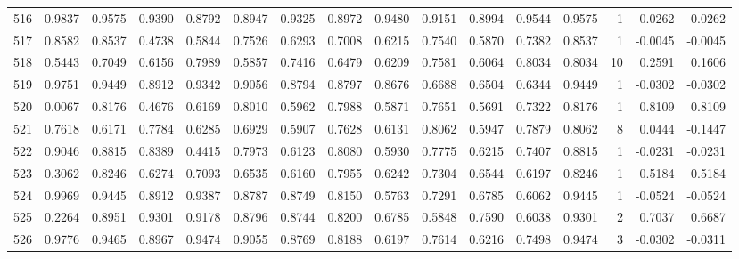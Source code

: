 \begin{tabular}{lrrrrrrrrrrrrrrr}
516 &      0.9837 &  0.9575 &  0.9390 &  0.8792 &  0.8947 &  0.9325 &  0.8972 &  0.9480 &  0.9151 &  0.8994 &   0.9544 &     0.9575 &      1 &                   -0.0262 &                    -0.0262 \\
517 &      0.8582 &  0.8537 &  0.4738 &  0.5844 &  0.7526 &  0.6293 &  0.7008 &  0.6215 &  0.7540 &  0.5870 &   0.7382 &     0.8537 &      1 &                   -0.0045 &                    -0.0045 \\
518 &      0.5443 &  0.7049 &  0.6156 &  0.7989 &  0.5857 &  0.7416 &  0.6479 &  0.6209 &  0.7581 &  0.6064 &   0.8034 &     0.8034 &     10 &                    0.2591 &                     0.1606 \\
519 &      0.9751 &  0.9449 &  0.8912 &  0.9342 &  0.9056 &  0.8794 &  0.8797 &  0.8676 &  0.6688 &  0.6504 &   0.6344 &     0.9449 &      1 &                   -0.0302 &                    -0.0302 \\
520 &      0.0067 &  0.8176 &  0.4676 &  0.6169 &  0.8010 &  0.5962 &  0.7988 &  0.5871 &  0.7651 &  0.5691 &   0.7322 &     0.8176 &      1 &                    0.8109 &                     0.8109 \\
521 &      0.7618 &  0.6171 &  0.7784 &  0.6285 &  0.6929 &  0.5907 &  0.7628 &  0.6131 &  0.8062 &  0.5947 &   0.7879 &     0.8062 &      8 &                    0.0444 &                    -0.1447 \\
522 &      0.9046 &  0.8815 &  0.8389 &  0.4415 &  0.7973 &  0.6123 &  0.8080 &  0.5930 &  0.7775 &  0.6215 &   0.7407 &     0.8815 &      1 &                   -0.0231 &                    -0.0231 \\
523 &      0.3062 &  0.8246 &  0.6274 &  0.7093 &  0.6535 &  0.6160 &  0.7955 &  0.6242 &  0.7304 &  0.6544 &   0.6197 &     0.8246 &      1 &                    0.5184 &                     0.5184 \\
524 &      0.9969 &  0.9445 &  0.8912 &  0.9387 &  0.8787 &  0.8749 &  0.8150 &  0.5763 &  0.7291 &  0.6785 &   0.6062 &     0.9445 &      1 &                   -0.0524 &                    -0.0524 \\
525 &      0.2264 &  0.8951 &  0.9301 &  0.9178 &  0.8796 &  0.8744 &  0.8200 &  0.6785 &  0.5848 &  0.7590 &   0.6038 &     0.9301 &      2 &                    0.7037 &                     0.6687 \\
526 &      0.9776 &  0.9465 &  0.8967 &  0.9474 &  0.9055 &  0.8769 &  0.8188 &  0.6197 &  0.7614 &  0.6216 &   0.7498 &     0.9474 &      3 &                   -0.0302 &                    -0.0311 \\

\end{tabular}
